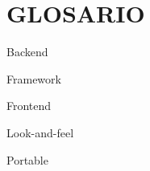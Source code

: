 \chapter*{GLOSARIO}

\begin{description}
    \item Backend
    \item Framework
    \item Frontend
    \item Look-and-feel
    \item Portable
\end{description}

\clearpage